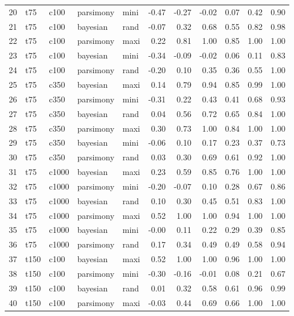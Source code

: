 \documentclass[12pt,letterpaper]{article}
\begin{document}
\begin{longtable}{rllllrrrrrr}
  20 & t75 & c100 & parsimony & mini & -0.47 & -0.27 & -0.02 & 0.07 & 0.42 & 0.90 \\ 
  21 & t75 & c100 & bayesian & rand & -0.07 & 0.32 & 0.68 & 0.55 & 0.82 & 0.98 \\ 
  22 & t75 & c100 & parsimony & maxi & 0.22 & 0.81 & 1.00 & 0.85 & 1.00 & 1.00 \\ 
  23 & t75 & c100 & bayesian & mini & -0.34 & -0.09 & -0.02 & 0.06 & 0.11 & 0.83 \\ 
  24 & t75 & c100 & parsimony & rand & -0.20 & 0.10 & 0.35 & 0.36 & 0.55 & 1.00 \\ 
  25 & t75 & c350 & bayesian & maxi & 0.14 & 0.79 & 0.94 & 0.85 & 0.99 & 1.00 \\ 
  26 & t75 & c350 & parsimony & mini & -0.31 & 0.22 & 0.43 & 0.41 & 0.68 & 0.93 \\ 
  27 & t75 & c350 & bayesian & rand & 0.04 & 0.56 & 0.72 & 0.65 & 0.84 & 1.00 \\ 
  28 & t75 & c350 & parsimony & maxi & 0.30 & 0.73 & 1.00 & 0.84 & 1.00 & 1.00 \\ 
  29 & t75 & c350 & bayesian & mini & -0.06 & 0.10 & 0.17 & 0.23 & 0.37 & 0.73 \\ 
  30 & t75 & c350 & parsimony & rand & 0.03 & 0.30 & 0.69 & 0.61 & 0.92 & 1.00 \\ 
  31 & t75 & c1000 & bayesian & maxi & 0.23 & 0.59 & 0.85 & 0.76 & 1.00 & 1.00 \\ 
  32 & t75 & c1000 & parsimony & mini & -0.20 & -0.07 & 0.10 & 0.28 & 0.67 & 0.86 \\ 
  33 & t75 & c1000 & bayesian & rand & 0.10 & 0.30 & 0.45 & 0.51 & 0.83 & 1.00 \\ 
  34 & t75 & c1000 & parsimony & maxi & 0.52 & 1.00 & 1.00 & 0.94 & 1.00 & 1.00 \\ 
  35 & t75 & c1000 & bayesian & mini & -0.00 & 0.11 & 0.22 & 0.29 & 0.39 & 0.85 \\ 
  36 & t75 & c1000 & parsimony & rand & 0.17 & 0.34 & 0.49 & 0.49 & 0.58 & 0.94 \\ 
  37 & t150 & c100 & bayesian & maxi & 0.52 & 1.00 & 1.00 & 0.96 & 1.00 & 1.00 \\ 
  38 & t150 & c100 & parsimony & mini & -0.30 & -0.16 & -0.01 & 0.08 & 0.21 & 0.67 \\ 
  39 & t150 & c100 & bayesian & rand & 0.01 & 0.32 & 0.58 & 0.61 & 0.96 & 0.99 \\ 
  40 & t150 & c100 & parsimony & maxi & -0.03 & 0.44 & 0.69 & 0.66 & 1.00 & 1.00 \\ 

\end{longtable}
\end{document}
